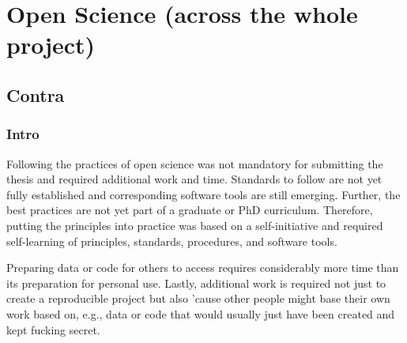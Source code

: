 



\section{Open Science (across the whole project)}







\subsection{Contra}



\subsubsection{Intro}
%
Following the practices of open science was not mandatory for submitting the
thesis and required additional work and time.
%
Standards to follow are not yet fully established and corresponding software
tools are still emerging.
%
Further, the best practices are not yet part of a graduate or PhD curriculum.
%
Therefore, putting the principles into practice was based on a self-initiative
and required self-learning of principles, standards, procedures, and software
tools.

Preparing data or code for others to access requires considerably more time than
its preparation for personal use.
Lastly, additional work is required not just to create a reproducible project
but also 'cause other people might base their own work based on, e.g., data or
code that would usually just have been created and kept fucking secret.

